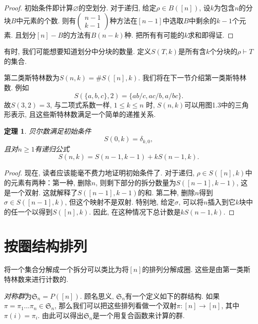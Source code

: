 \documentclass{ctexbook}
\newtheorem{thm}{定理}[section]
\begin{document}
   \begin{proof}
   	初始条件即计算$\varnothing$的空划分. 对于递归, 给定$\rho \in B([n])$, 设$k$为包含$n$的分块$B$中元素的个数.
   	则有$\left(\begin{array}{l}n-1 \\ k-1\end{array}\right)$种方法在$[n-1]$中选取$B$中剩余的$k-1$个元素.
   	且划分$[n]-B$的方法有$B(n-k)$种. 把所有有可能的$k$求和即得证.
   \end{proof}


有时, 我们可能想要知道划分中分块的数量. 定义$S(T, k)$是所有含$k$个分块的$\rho \vdash T$的集合.

第二类斯特林数为$S(n, k)=\# S([n], k)$. 我们将在下一节介绍第一类斯特林数. 例如
$$
S(\{a, b, c\}, 2)=\{a b / c, a c / b, a / b c\}.
$$
故$S(3,2)=3$, 与二项式系数一样, $1 \leqslant k \leqslant n$ 时, $S(n, k)$可以用图1.3中的三角形表示, 且这些斯特林数满足一个简单的递推关系.
    \begin{thm}
    	贝尔数满足初始条件
    	$$S(0, k)=\delta_{k, 0},$$
    	且对$n \geqslant 1$有递归公式
    	$$
    	S(n, k)=S(n-1, k-1)+k S(n-1, k).
    	$$
    \end{thm}
    \begin{proof}
    	现在, 读者应该能毫不费力地证明初始条件了. 对于递归, $\rho \in S([n], k)$中的元素有两种：第一种, 删除$n$, 则剩下部分的拆分数量为$S([n-1], k-1)$,
    	这是一个双射. 这就解释了$S([n-1], k-1)$的和. 第二种, 删除$n$得到$\sigma \in S([n-1], k)$, 但这个映射不是双射. 特别地,
    	给定$\sigma$, 可以将$n$插入到它$k$块中的任一个以得到$S([n], k)$. 因此, 在这种情况下总计数是$k S(n-1, k)$.
    \end{proof}


\section{按圈结构排列}
将一个集合分解成一个拆分可以类比为将$[n]$的排列分解成圈. 这些是由第一类斯特林数来进行计数的.

\textsl{对称群}为$\mathfrak{S}_{n}=P([n])$. 顾名思义, $\mathfrak{S}_{n}$有一个定义如下的群结构. 如果$\pi=\pi_{1} \ldots \pi_{n} \in \mathfrak{S}_{n}$,
那么我们可以把这些排列看做一个双射$\pi:[n] \rightarrow[n]$, 其中$\pi(i)=\pi_{i}$. 由此可以得出$\mathfrak{S}_{n}$是一个用复合函数来计算的群.
\end{document}

